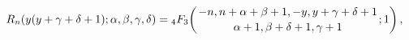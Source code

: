 \[\mathop{R_{n}\/}\nolimits\!\left(y(y+\gamma+\delta+1);\alpha,\beta,\gamma,%
\delta\right)=\mathop{{{}_{4}F_{3}}\/}\nolimits\!\left({-n,n+\alpha+\beta+1,-y%
,y+\gamma+\delta+1\atop\alpha+1,\beta+\delta+1,\gamma+1};1\right),\]
